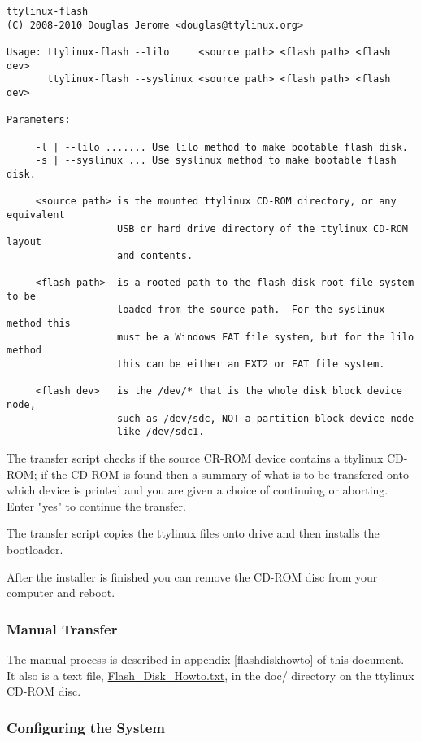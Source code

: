\documentclass[10pt]{article}
\begin{document}
\begin{lstlisting}
ttylinux-flash
(C) 2008-2010 Douglas Jerome <douglas@ttylinux.org>

Usage: ttylinux-flash --lilo     <source path> <flash path> <flash dev>
       ttylinux-flash --syslinux <source path> <flash path> <flash dev>

Parameters:

     -l | --lilo ....... Use lilo method to make bootable flash disk.
     -s | --syslinux ... Use syslinux method to make bootable flash disk.

     <source path> is the mounted ttylinux CD-ROM directory, or any equivalent
                   USB or hard drive directory of the ttylinux CD-ROM layout
                   and contents.

     <flash path>  is a rooted path to the flash disk root file system to be
                   loaded from the source path.  For the syslinux method this
                   must be a Windows FAT file system, but for the lilo method
                   this can be either an EXT2 or FAT file system.

     <flash dev>   is the /dev/* that is the whole disk block device node,
                   such as /dev/sdc, NOT a partition block device node
                   like /dev/sdc1.
\end{lstlisting}

The transfer script checks if the source CR-ROM device contains a ttylinux
CD-ROM; if the CD-ROM is found then a summary of what is to be transfered onto
which device is printed and you are given a choice of continuing or aborting.
Enter "yes" to continue the transfer.

The transfer script copies the ttylinux files onto drive and then installs the
bootloader.

After the installer is finished you can remove the CD-ROM disc from your
computer and reboot.

\subsubsection{Manual Transfer}

The manual process is described in appendix \ref{flashdiskhowto} of this
document. It also is a text file, \url{Flash_Disk_Howto.txt}, in the doc/
directory on the ttylinux CD-ROM disc.

\subsubsection{Configuring the System}
\label{flashback}
\end{document}
